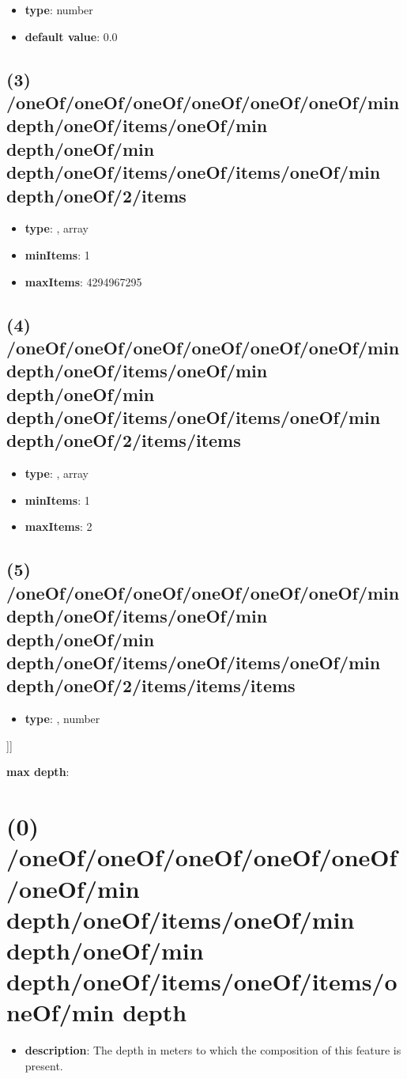 \begin{itemize}[leftmargin=4em]\item {\bf type}: number\item {\bf default value}: 0.0
\end{itemize}\subsection{(3) /oneOf/oneOf/oneOf/oneOf/oneOf/oneOf/min depth/oneOf/items/oneOf/min depth/oneOf/min depth/oneOf/items/oneOf/items/oneOf/min depth/oneOf/2/items}
\begin{itemize}[leftmargin=3em]\item {\bf type}: , array\item {\bf minItems}: 1
\item {\bf maxItems}: 4294967295
\end{itemize}\subsection{(4) /oneOf/oneOf/oneOf/oneOf/oneOf/oneOf/min depth/oneOf/items/oneOf/min depth/oneOf/min depth/oneOf/items/oneOf/items/oneOf/min depth/oneOf/2/items/items}
\begin{itemize}[leftmargin=4em]\item {\bf type}: , array\item {\bf minItems}: 1
\item {\bf maxItems}: 2
\end{itemize}\subsection{(5) /oneOf/oneOf/oneOf/oneOf/oneOf/oneOf/min depth/oneOf/items/oneOf/min depth/oneOf/min depth/oneOf/items/oneOf/items/oneOf/min depth/oneOf/2/items/items/items}
\begin{itemize}[leftmargin=5em]\item {\bf type}: , number\end{itemize}]]\item {\bf max depth}: \section{(0) /oneOf/oneOf/oneOf/oneOf/oneOf/oneOf/min depth/oneOf/items/oneOf/min depth/oneOf/min depth/oneOf/items/oneOf/items/oneOf/min depth}
\begin{itemize}[leftmargin=0em]\item {\bf description}: The depth in meters to which the composition of this feature is present.
\end{itemize}
